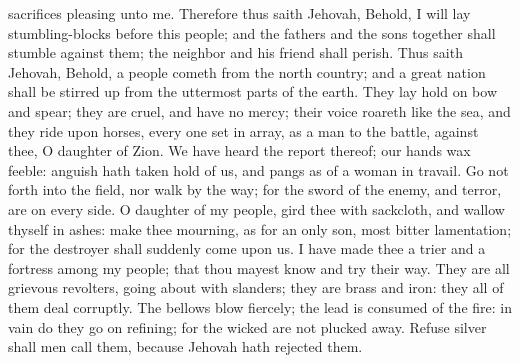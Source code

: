 sacrifices pleasing unto me. Therefore thus saith Jehovah, Behold, I will lay stumbling-blocks before this people; and the fathers and the sons together shall stumble against them; the neighbor and his friend shall perish.  Thus saith Jehovah, Behold, a people cometh from the north country; and a great nation shall be stirred up from the uttermost parts of the earth. They lay hold on bow and spear; they are cruel, and have no mercy; their voice roareth like the sea, and they ride upon horses, every one set in array, as a man to the battle, against thee, O daughter of Zion. We have heard the report thereof; our hands wax feeble: anguish hath taken hold of us, and pangs as of a woman in travail. Go not forth into the field, nor walk by the way; for the sword of the enemy, and terror, are on every side. O daughter of my people, gird thee with sackcloth, and wallow thyself in ashes: make thee mourning, as for an only son, most bitter lamentation; for the destroyer shall suddenly come upon us.  I have made thee a trier and a fortress among my people; that thou mayest know and try their way. They are all grievous revolters, going about with slanders; they are brass and iron: they all of them deal corruptly. The bellows blow fiercely; the lead is consumed of the fire: in vain do they go on refining; for the wicked are not plucked away. Refuse silver shall men call them, because Jehovah hath rejected them. 


